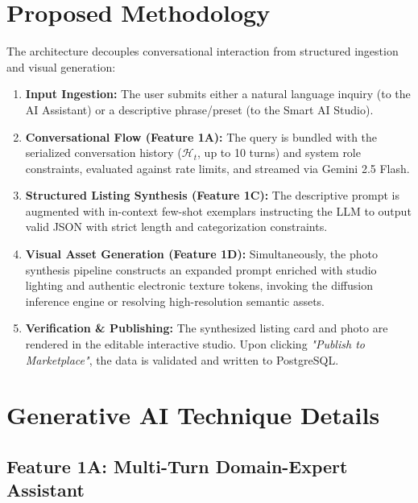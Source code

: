 \documentclass[12pt,a4paper]{article}
\begin{document}
\section{Proposed Methodology}

The architecture decouples conversational interaction from structured ingestion and visual generation:
\begin{enumerate}
    \item \textbf{Input Ingestion:} The user submits either a natural language inquiry (to the AI Assistant) or a descriptive phrase/preset (to the Smart AI Studio).
    \item \textbf{Conversational Flow (Feature 1A):} The query is bundled with the serialized conversation history ($\mathcal{H}_t$, up to 10 turns) and system role constraints, evaluated against rate limits, and streamed via Gemini 2.5 Flash.
    \item \textbf{Structured Listing Synthesis (Feature 1C):} The descriptive prompt is augmented with in-context few-shot exemplars instructing the LLM to output valid JSON with strict length and categorization constraints.
    \item \textbf{Visual Asset Generation (Feature 1D):} Simultaneously, the photo synthesis pipeline constructs an expanded prompt enriched with studio lighting and authentic electronic texture tokens, invoking the diffusion inference engine or resolving high-resolution semantic assets.
    \item \textbf{Verification \& Publishing:} The synthesized listing card and photo are rendered in the editable interactive studio. Upon clicking \textit{"Publish to Marketplace"}, the data is validated and written to PostgreSQL.
\end{enumerate}

\section{Generative AI Technique Details}

\subsection{Feature 1A: Multi-Turn Domain-Expert Assistant}
\end{document}
